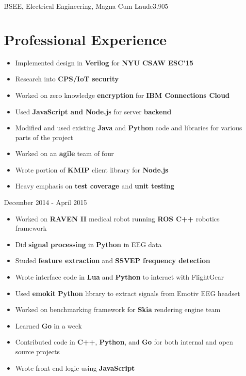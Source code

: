 \documentclass{my_resume}
\begin{document}

	{BSEE, Electrical Engineering, Magna Cum Laude}{3.905}

\section{Professional Experience}
\begin{itemize}
    \itemsep0em
    \item Implemented design in \textbf{Verilog} for \textbf{NYU CSAW ESC'15}
    \item Research into \textbf{CPS/IoT security}
\end{itemize}
\begin{itemize}
    \itemsep0em
	\item Worked on zero knowledge \textbf{encryption} for 
		\textbf{IBM Connections Cloud}
	\item Used \textbf{JavaScript and Node.js} for server \textbf{backend}
	\item Modified and used existing \textbf{Java} and \textbf{Python} code
		and libraries for various parts of the project
	\item Worked on an \textbf{agile} team of four
	\item Wrote portion of \textbf{KMIP} client library for \textbf{Node.js}
    \item Heavy emphasis on \textbf{test coverage} and \textbf{unit testing}
\end{itemize}
	{December 2014 - April 2015}
\begin{itemize}
    \itemsep0em
	\item Worked on \textbf{RAVEN II} medical robot running \textbf{ROS C++}
		robotics framework
	\item Did \textbf{signal processing} in \textbf{Python} in EEG data
	\item Studed \textbf{feature extraction} and \textbf{SSVEP frequency detection}
	\item Wrote interface code in \textbf{Lua} and \textbf{Python} to interact
		with FlightGear
	\item Used \textbf{emokit} \textbf{Python} library to extract signals from
		Emotiv EEG headset
\end{itemize}
\begin{itemize}
    \itemsep0em
	\item Worked on benchmarking framework for \textbf{Skia} rendering engine team
	\item Learned \textbf{Go} in a week
	\item Contributed code in \textbf{C++}, \textbf{Python}, and \textbf{Go} for
		both internal and open source projects
	\item Wrote front end logic using \textbf{JavaScript}
\end{itemize}
\end{document}
